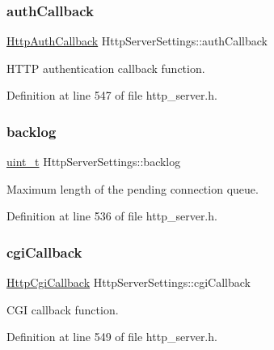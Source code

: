 \subsubsection{\texorpdfstring{auth\+Callback}{authCallback}}
{\footnotesize\ttfamily \hyperlink{http__server_8h_a8c17db78456f3dac1c2cabf3c0ddacff}{Http\+Auth\+Callback} Http\+Server\+Settings\+::auth\+Callback}



H\+T\+TP authentication callback function. 



Definition at line 547 of file http\+\_\+server.\+h.

\mbox{\label{structHttpServerSettings_aa05118aaa9c4c355bc8c3c95ece110c9}} 
\subsubsection{\texorpdfstring{backlog}{backlog}}
{\footnotesize\ttfamily \hyperlink{compiler__port_8h_a12a1e9b3ce141648783a82445d02b58d}{uint\+\_\+t} Http\+Server\+Settings\+::backlog}



Maximum length of the pending connection queue. 



Definition at line 536 of file http\+\_\+server.\+h.

\mbox{\label{structHttpServerSettings_abee5b324f9d0469ec4011cd02a19db50}} 
\subsubsection{\texorpdfstring{cgi\+Callback}{cgiCallback}}
{\footnotesize\ttfamily \hyperlink{http__server_8h_a8c163dde36b62e9d132e1cf5fe4b41ea}{Http\+Cgi\+Callback} Http\+Server\+Settings\+::cgi\+Callback}



C\+GI callback function. 



Definition at line 549 of file http\+\_\+server.\+h.

\mbox{\label{structHttpServerSettings_aa3f92614da4bf57aae294024618b66c1}} 
